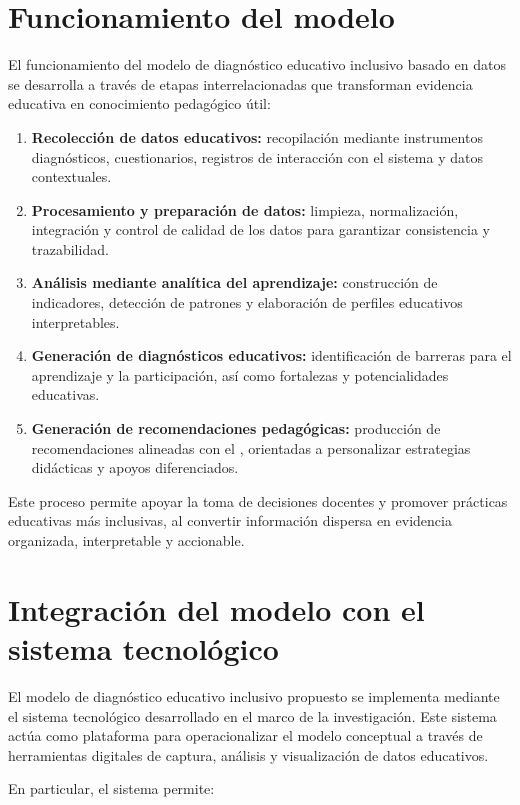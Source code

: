 \begin{refsection}
\section{Funcionamiento del modelo}

El funcionamiento del modelo de diagnóstico educativo inclusivo basado en datos se desarrolla a través de etapas interrelacionadas que transforman evidencia educativa en conocimiento pedagógico útil:

\begin{enumerate}
\item \textbf{Recolección de datos educativos:} recopilación mediante instrumentos diagnósticos, cuestionarios, registros de interacción con el sistema y datos contextuales.
\item \textbf{Procesamiento y preparación de datos:} limpieza, normalización, integración y control de calidad de los datos para garantizar consistencia y trazabilidad.
\item \textbf{Análisis mediante analítica del aprendizaje:} construcción de indicadores, detección de patrones y elaboración de perfiles educativos interpretables.
\item \textbf{Generación de diagnósticos educativos:} identificación de barreras para el aprendizaje y la participación, así como fortalezas y potencialidades educativas.
\item \textbf{Generación de recomendaciones pedagógicas:} producción de recomendaciones alineadas con el \DUA, orientadas a personalizar estrategias didácticas y apoyos diferenciados.
\end{enumerate}

Este proceso permite apoyar la toma de decisiones docentes y promover prácticas educativas más inclusivas, al convertir información dispersa en evidencia organizada, interpretable y accionable.

\section{Integración del modelo con el sistema tecnológico}

El modelo de diagnóstico educativo inclusivo propuesto se implementa mediante el sistema tecnológico desarrollado en el marco de la investigación. Este sistema actúa como plataforma para operacionalizar el modelo conceptual a través de herramientas digitales de captura, análisis y visualización de datos educativos.

En particular, el sistema permite:


\end{refsection}
